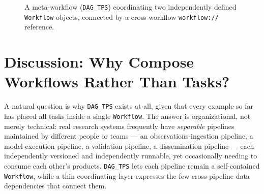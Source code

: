 \begin{figure}[h]
\centering
{}
\caption{A meta-workflow (\texttt{DAG\_TPS}) coordinating two independently
defined \texttt{Workflow} objects, connected by a cross-workflow
\texttt{workflow://} reference.}
\label{fig:meta-workflow}
\end{figure}

\section{Discussion: Why Compose Workflows Rather Than Tasks?}

A natural question is why \texttt{DAG\_TPS} exists at all, given that every
example so far has placed all tasks inside a single \texttt{Workflow}.
The answer is organizational, not merely technical: real research systems
frequently have \emph{separable} pipelines maintained by different people or
teams --- an observations-ingestion pipeline, a model-execution pipeline, a
validation pipeline, a dissemination pipeline --- each independently
versioned and independently runnable, yet occasionally needing to consume
each other's products. \texttt{DAG\_TPS} lets each pipeline remain a
self-contained \texttt{Workflow}, while a thin coordinating layer expresses
the few cross-pipeline data dependencies that connect them.

